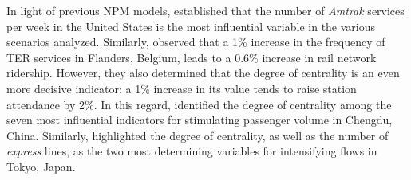 \begin{refsegment}

In light of previous \acrshort{NPM} models, \textcolor{blue}{\textcite[8]{cummings_does_2022}} established that the number of \textsl{Amtrak} services per week in the United States is the most influential variable in the various scenarios analyzed. Similarly, \textcolor{blue}{\textcite[5]{caset_integrating_2020}} observed that a 1\% increase in the frequency of \acrshort{TER} services in Flanders, Belgium, leads to a 0.6\% increase in rail network ridership. However, they also determined that the degree of centrality is an even more decisive indicator: a 1\% increase in its value tends to raise station attendance by 2\%. In this regard, \textcolor{blue}{\textcite[11]{amini_pishro_node_2022}} identified the degree of centrality among the seven most influential indicators for stimulating passenger volume in Chengdu, China. Similarly, \textcolor{blue}{\textcite[9]{cao_coordination_2020}} highlighted the degree of centrality, as well as the number of \textsl{express} lines, as the two most determining variables for intensifying flows in Tokyo, Japan.%


\end{refsegment}
